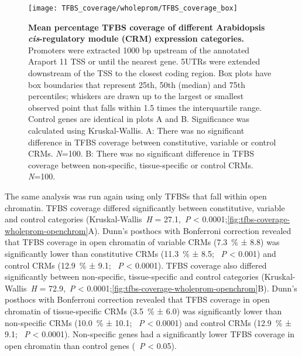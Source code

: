 \documentclass[../main.tex]{subfiles}
\begin{document}
\begin{figure}[hbt!]
	\begin{center}
		\capstart
		\texttt{[image: TFBS\_coverage/wholeprom/TFBS\_coverage\_box]}
		\caption{
			\textbf{Mean percentage TFBS coverage of different Arabidopsis \textit{cis}\hyp{}regulatory module (CRM) expression categories.}
			Promoters were extracted 1000 bp upstream of the annotated Araport 11 \autocite{chengAraport11CompleteReannotation2017} TSS or until the nearest gene.
			5UTRs were extended downstream of the TSS to the closest coding region.  Box plots have box boundaries that represent 25th, 50th (median) and 75th percentiles; whiskers are drawn up to the largest or smallest observed point that falls within 1.5 times the interquartile range.
			Control genes are identical in plots A and B.
			Significance was calculated using Kruskal\hyp{}Wallis.
			A: There was no significant difference in TFBS coverage between constitutive, variable or control CRMs. \textit{N}=100.
			B: There was no significant difference in TFBS coverage between non\hyp{}specific, tissue\hyp{}specific or control CRMs. \textit{N}=100.
			\label{fig:tfbs-coverage-wholeprom}
		}
	\end{center}
\end{figure}
The same analysis was run again using only TFBSs that fall within open chromatin. TFBS coverage differed significantly between constitutive, variable and control categories (Kruskal\hyp{}Wallis~\textit{H} = 27.1,~\textit{P} \textless{} 0.0001;\autoref{fig:tfbs-coverage-wholeprom-openchrom}A).
Dunn's posthocs with Bonferroni correction revealed that TFBS coverage in open chromatin of variable CRMs (\SI{7.3}{\percent} ± 8.8) was significantly lower than constitutive CRMs (\SI{11.3}{\percent} ± 8.5; ~\textit{P} \textless{} 0.001) and control CRMs (\SI{12.9}{\percent} ± 9.1; ~\textit{P} \textless{} 0.0001).
TFBS coverage also differed significantly between non\hyp{}specific, tissue\hyp{}specific and control categories (Kruskal\hyp{}Wallis~\textit{H} = 72.9,~\textit{P} \textless{} 0.0001;\autoref{fig:tfbs-coverage-wholeprom-openchrom}B).
Dunn's posthocs with Bonferroni correction revealed that TFBS coverage in open chromatin of tissue\hyp{}specific CRMs (\SI{3.5}{\percent} ± 6.0) was significantly lower than non\hyp{}specific CRMs (\SI{10.0}{\percent} ± 10.1; ~\textit{P} \textless{} 0.0001) and control CRMs (\SI{12.9}{\percent} ± 9.1; ~\textit{P} \textless{} 0.0001).
Non\hyp{}specific genes had a significantly lower TFBS coverage in open chromatin than control genes (~\textit{P} \textless{} 0.05).
\end{document}
